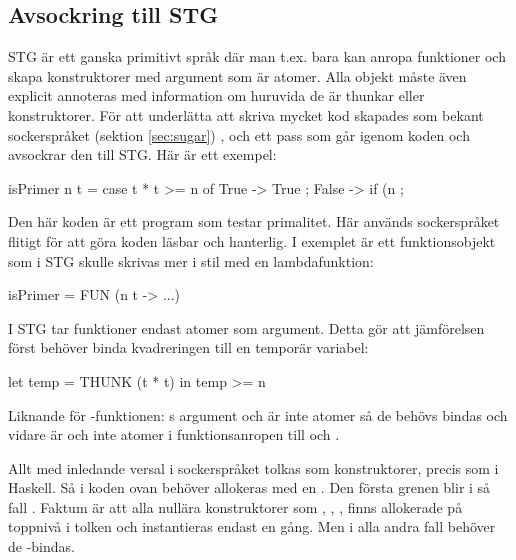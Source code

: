 \documentclass[../Core]{subfiles}
\begin{document}
\subsection{Avsockring till STG}
\label{sec:Diabetes}

STG är ett ganska primitivt språk där man t.ex. bara kan anropa funktioner
och skapa konstruktorer med argument som är atomer. Alla objekt måste även
explicit annoteras med information om huruvida de är thunkar eller konstruktorer. För att underlätta
att skriva mycket kod skapades som bekant sockerspråket (sektion \ref{sec:sugar})
, och ett
pass som går igenom koden och avsockrar den till STG. Här är ett exempel:

\begin{codeEx}
isPrimer n t = case t * t >= n of
    { True -> True
    ; False -> if (n %
    };
\end{codeEx}

Den här koden är ett program som testar
primalitet. Här används sockerspråket flitigt för att göra koden läsbar
och hanterlig. I exemplet är  ett funktionsobjekt som i 
STG skulle skrivas mer i stil med en lambdafunktion:

\begin{codeEx}          
isPrimer = FUN (n t -> ...)
\end{codeEx}


I STG tar funktioner endast atomer som argument. Detta gör att 
jämförelsen  först behöver binda kvadreringen
till en temporär variabel:

\begin{codeEx}
let temp = THUNK (t * t)
in  temp >= n
\end{codeEx}

Liknande för -funktionen: s argument  och 
 är inte atomer så de behövs bindas och vidare
är  och  inte atomer i  
funktionsanropen till \miniCode{==} och .


Allt med inledande versal i sockerspråket tolkas som konstruktorer,
precis som i Haskell. Så  i koden ovan behöver allokeras med
en . Den första grenen blir i så fall
  .
Faktum är att alla nullära konstruktorer som , , , finns 
allokerade på toppnivå i tolken och instantieras endast en gång. 
Men i alla andra fall behöver de -bindas.
\end{document}
